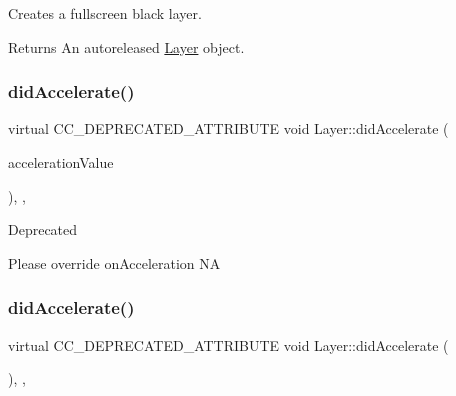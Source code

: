 Creates a fullscreen black layer.

\begin{DoxyReturn}{Returns}
An autoreleased \hyperlink{classLayer}{Layer} object. 
\end{DoxyReturn}
\mbox{\label{classLayer_aea727ae25fc6f47bd9ef029cb99c629a}} 
\subsubsection{\texorpdfstring{did\+Accelerate()}{didAccelerate()}\hspace{0.1cm}{\footnotesize\ttfamily [1/2]}}
{\footnotesize\ttfamily virtual C\+C\+\_\+\+D\+E\+P\+R\+E\+C\+A\+T\+E\+D\+\_\+\+A\+T\+T\+R\+I\+B\+U\+TE void Layer\+::did\+Accelerate (\begin{DoxyParamCaption}\item[{\hyperlink{classAcceleration}{Acceleration} $\ast$}]{acceleration\+Value }\end{DoxyParamCaption})\hspace{0.3cm}{\ttfamily [inline]}, {\ttfamily [final]}, {\ttfamily [virtual]}}

\begin{DoxyRefDesc}{Deprecated}
\item[\hyperlink{deprecated__deprecated000026}{Deprecated}]Please override on\+Acceleration  NA \end{DoxyRefDesc}
\mbox{\label{classLayer_ad38c31e14fb4fb9561eede982d6b8ef5}} 
\subsubsection{\texorpdfstring{did\+Accelerate()}{didAccelerate()}\hspace{0.1cm}{\footnotesize\ttfamily [2/2]}}
{\footnotesize\ttfamily virtual C\+C\+\_\+\+D\+E\+P\+R\+E\+C\+A\+T\+E\+D\+\_\+\+A\+T\+T\+R\+I\+B\+U\+TE void Layer\+::did\+Accelerate (\begin{DoxyParamCaption}\item[{\hyperlink{classAcceleration}{Acceleration} $\ast$}]{ }\end{DoxyParamCaption})\hspace{0.3cm}{\ttfamily [inline]}, {\ttfamily [final]}, {\ttfamily [virtual]}}

